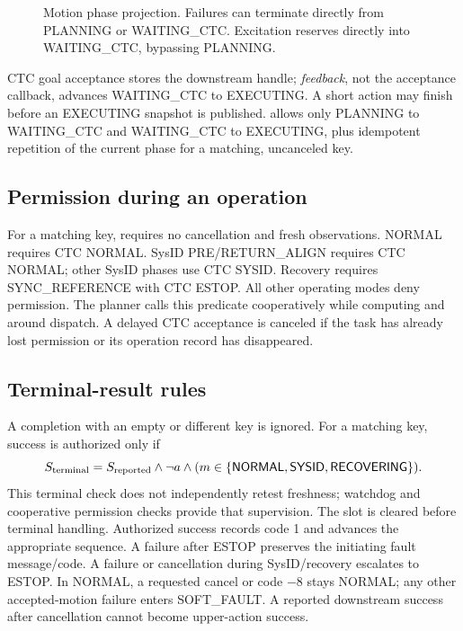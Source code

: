 \documentclass[11pt,a4paper]{report}
\newcommand{\id}[1]{\texttt{\small\detokenize{#1}}}
\newcommand{\N}{\mathsf{NORMAL}}
\newcommand{\Y}{\mathsf{SYSID}}
\newcommand{\Rec}{\mathsf{RECOVERING}}
\begin{document}
\begin{figure}[htbp]
\centering
{}
\caption{Motion phase projection. Failures can terminate directly from PLANNING or WAITING\_CTC. Excitation reserves directly into WAITING\_CTC, bypassing PLANNING.}
\end{figure}
CTC goal acceptance stores the downstream handle; \emph{feedback}, not the acceptance callback, advances WAITING\_CTC to EXECUTING. A short action may finish before an EXECUTING snapshot is published. \id{change_motion_phase()} allows only PLANNING to WAITING\_CTC and WAITING\_CTC to EXECUTING, plus idempotent repetition of the current phase for a matching, uncanceled key.

\subsection{Permission during an operation}
For a matching key, \id{permitted()} requires no cancellation and fresh observations. NORMAL requires CTC NORMAL. SysID PRE/RETURN\_ALIGN requires CTC NORMAL; other SysID phases use CTC SYSID. Recovery requires SYNC\_REFERENCE with CTC ESTOP. All other operating modes deny permission. The planner calls this predicate cooperatively while computing and around dispatch. A delayed CTC acceptance is canceled if the task has already lost permission or its operation record has disappeared.

\subsection{Terminal-result rules}
A completion with an empty or different key is ignored. For a matching key, success is authorized only if
\begin{equation}
 S_{\rm terminal}=S_{\rm reported}\land\neg a\land
               (m\in\{\N,\Y,\Rec\}).
\end{equation}
This terminal check does not independently retest freshness; watchdog and cooperative permission checks provide that supervision. The slot is cleared before terminal handling. Authorized success records code 1 and advances the appropriate sequence. A failure after ESTOP preserves the initiating fault message/code. A failure or cancellation during SysID/recovery escalates to ESTOP. In NORMAL, a requested cancel or code $-8$ stays NORMAL; any other accepted-motion failure enters SOFT\_FAULT. A reported downstream success after cancellation cannot become upper-action success.
\end{document}
